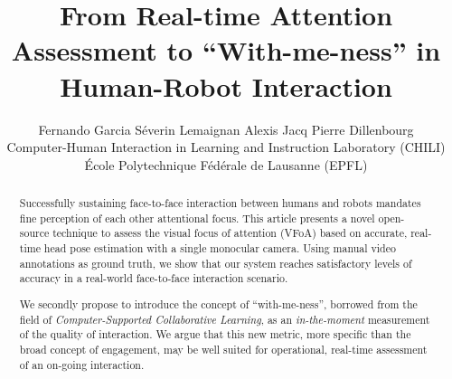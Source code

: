 \documentclass{sig-alternate}
\begin{document}
%

\title{From Real-time Attention Assessment to ``With-me-ness'' in Human-Robot Interaction}
\author{Fernando Garcia \qquad Séverin Lemaignan \qquad Alexis Jacq \qquad Pierre Dillenbourg\\Computer-Human Interaction in Learning and Instruction Laboratory (CHILI)\\École Polytechnique Fédérale de Lausanne (EPFL)}


\maketitle
\begin{abstract}

Successfully sustaining face-to-face interaction between humans and robots
mandates fine perception of each other attentional focus. This article presents
a novel open-source technique to assess the visual focus of attention (VFoA)
based on accurate, real-time head pose estimation with a single monocular
camera.  Using manual video annotations as ground truth, we show that our system
reaches satisfactory levels of accuracy in a real-world face-to-face interaction
scenario.

We secondly propose to introduce the concept of ``with-me-ness'', borrowed from the
field of {\it Computer-Supported Collaborative Learning}, as an
\emph{in-the-moment} measurement of the quality of interaction. We argue that
this new metric, more specific than the broad concept of engagement, may be well
suited for operational, real-time assessment of an on-going interaction.

\end{abstract}



\end{document}
